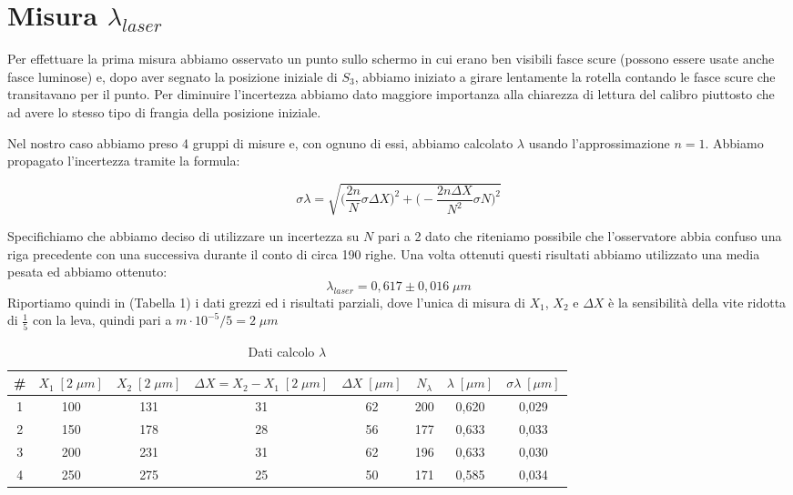 \documentclass{article}
\begin{document}
\section{Misura $\lambda_{laser}$}
Per effettuare la prima misura abbiamo osservato un punto sullo schermo in cui erano ben visibili fasce scure (possono essere usate anche fasce luminose) e, dopo aver segnato la posizione iniziale di $S_3$, abbiamo iniziato a girare lentamente la rotella contando le fasce scure che transitavano per il punto. Per diminuire l'incertezza abbiamo dato maggiore importanza alla chiarezza di lettura del calibro piuttosto che ad avere lo stesso tipo di frangia della posizione iniziale.

\vspace{3mm}

Nel nostro caso abbiamo preso 4 gruppi di misure e, con ognuno di essi, abbiamo calcolato $\lambda$ usando l'approssimazione $n = 1$. Abbiamo propagato l'incertezza tramite la formula:

\begin{equation} 
\sigma\lambda= \sqrt{\bigg(\frac{2 n}{N} \sigma\Delta X\bigg)^2 + \bigg({-} \frac{2 n \Delta X}{N^2} \sigma N\bigg)^2}
\end{equation}

Specifichiamo che abbiamo deciso di utilizzare un incertezza su $N$ pari a 2 dato che riteniamo possibile che l'osservatore abbia confuso una riga precedente con una successiva durante il conto di circa 190 righe.
Una volta ottenuti questi risultati abbiamo utilizzato una media pesata ed abbiamo ottenuto:
\[ \lambda_{laser} = 0,617 \pm 0,016 \; \mu m \]
Riportiamo quindi in (Tabella 1) i dati grezzi ed i risultati parziali, dove l'unica di misura di $X_1$, $X_2$ e $\Delta X$ è la sensibilità della vite ridotta di $\frac{1}{5}$ con la leva, quindi pari a $m \cdot 10^{-5} /5 = 2 \; \mu m$


\begin{table}[h!]
\centering
\begin{tabular}{ | c | c | c | c | c | c | c | c |}
\hline
 \# & $X_1 \; [2 \; \mu m]$ & $X_2 \; [2 \; \mu m]$ & $\Delta X = X_2 - X_1\; [2 \; \mu m]$ & $\Delta X \; [\mu m]$ & $N_\lambda$ & $\lambda \; [\mu m]$ & $\sigma\lambda \; [\mu m]$\\
\hline
   1 & 100 & 131 & 31 & 62 & 200 & 0,620 & 0,029\\
   2 & 150 & 178 & 28 & 56 & 177 & 0,633 & 0,033\\
   3 & 200 & 231 & 31 & 62 & 196 & 0,633 & 0,030\\
   4 & 250 & 275 & 25 & 50 & 171 & 0,585 & 0,034\\
\hline
\end{tabular}
\caption{Dati calcolo $\lambda$}
\label{table:1}
\end{table}
\end{document}
